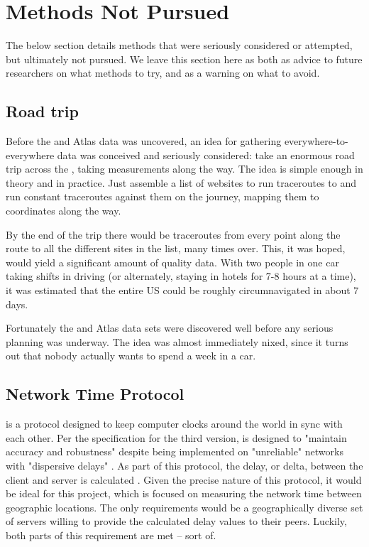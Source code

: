 \section{Methods Not Pursued}\label{sec:design_unused_methods}%

The below section details methods that were seriously considered or attempted, but ultimately not pursued. We leave this section here as both as advice to future researchers on what methods to try, and as a warning on what to avoid.

\subsection{Road trip}

Before the \caida and \ripe Atlas data was uncovered, an idea for gathering everywhere-to-everywhere data was conceived and seriously considered: take an enormous road trip across the \us, taking measurements along the way. The idea is simple enough in theory and in practice. Just assemble a list of websites to run traceroutes to and run constant traceroutes against them on the journey, mapping them to \gps coordinates along the way.

By the end of the trip there would be traceroutes from every point along the route to all the different sites in the list, many times over. This, it was hoped, would yield a significant amount of quality data. With two people in one car taking shifts in driving (or alternately, staying in hotels for 7-8 hours at a time), it was estimated that the entire US could be roughly circumnavigated in about 7 days.

Fortunately the \caida and \ripe Atlas data sets were discovered well before any serious planning was underway. The idea was almost immediately nixed, since it turns out that nobody actually wants to spend a week in a car.

\subsection{Network Time Protocol}

\ntp is a protocol designed to keep computer clocks around the world in sync with each other. Per the specification for the third version, \ntp is designed to "maintain accuracy and robustness" despite being implemented on "unreliable" networks with "dispersive delays" \cite{rfc1305}. As part of this protocol, the delay, or delta, between the client and server is calculated \cite{rfc5905}. Given the precise nature of this protocol, it would be ideal for this project, which is focused on measuring the network time between geographic locations. The only requirements would be a geographically diverse set of \ntp servers willing to provide the calculated delay values to their peers. Luckily, both parts of this requirement are met -- sort of.

